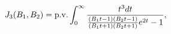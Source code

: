\begin{equation}\label{IDB1B2}
  J_3(B_1,B_2)={\rm p.v.}
\int_{0}^{\infty }\frac{t^{3}dt}{\frac{(B_{1}t-1)(B_{2}t-
1)}{(B_{1}t+1)(B_{2}t+1)}e^{2t}-1},
\end{equation}


